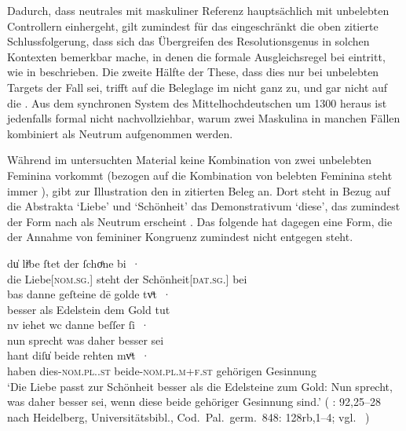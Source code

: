 Dadurch, dass neutrales  mit maskuliner Referenz hauptsächlich mit
unbelebten Controllern einhergeht, gilt zumindest für das \CAO{}
eingeschränkt die oben zitierte Schlussfolgerung, dass sich das Übergreifen des
Resolutionsgenus in solchen Kontexten bemerkbar mache, in
denen die formale Ausgleichsregel bei  eintritt, wie in
 beschrieben. Die zweite Hälfte der These, dass dies nur
bei unbelebten Targets der Fall sei, trifft auf die Beleglage im
\CAO{} nicht ganz zu, und gar nicht auf die \KC{}. Aus dem synchronen System
des Mittelhochdeutschen um 1300 heraus ist jedenfalls
formal nicht nachvollziehbar, warum zwei Maskulina in manchen
Fällen kombiniert als Neutrum aufgenommen werden.

Während im untersuchten Material keine Kombination von zwei
unbelebten Feminina vorkommt (bezogen auf die Kombination von
belebten Feminina steht immer ), gibt
\citet[384]{paul2007} zur Illustration den in 
zitierten Beleg an. Dort steht in Bezug auf die Abstrakta  `Liebe'
und  `Schönheit' das Demonstrativum
 `diese', das zumindest der Form nach als Neutrum erscheint
\autocite[485]{ksw2}. Das folgende  hat dagegen eine Form, die der
Annahme von femininer Kongruenz zumindest nicht entgegen steht.

\begin{exe}
\ex\label{ex:walther92_25-28_C_2}
	\gll du̍ liͤbe ſtet der ſchoͤne bi~· \\
			die Liebe[\textsc{nom.sg.\FemI}] steht der
			Schönheit[\textsc{dat.sg.\FemI}] bei \\
\sn \gll bas danne geſteine dē golde tvͦt~· \\
		besser als Edelstein dem Gold tut \\
\sn \gll nv iehet wc danne beſſer ſi~· \\
		nun sprecht was daher besser sei \\
\sn \gll hant diſu̍ beide rehten mvͦt~· \\
		haben dies-\textsc{nom.pl.\NeutI.st} beide-\textsc{nom.pl.m+f\subI.st}
			gehörigen Gesinnung \\
	\trans `Die Liebe passt zur Schönheit besser als die Edelsteine zum
		Gold: Nun sprecht, was daher besser sei, wenn diese beide gehöriger
		Gesinnung sind.'
		(%
			: 92,25--28 nach
			Heidelberg, Universitätsbibl., Cod.~Pal.~germ.~848: 128rb,1--4;
			vgl.~\cite[356--358]{bein2013}%
		)
	\\
\end{exe}

